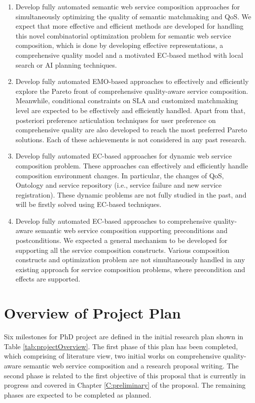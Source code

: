 \begin{enumerate}
 \item Develop fully automated semantic web service composition approaches for simultaneously optimizing the quality of semantic matchmaking and QoS. We expect that more effective and efficient methods are developed for handling this novel combinatorial optimization problem for semantic web service composition, which is done by developing effective representations, a comprehensive quality model and a motivated EC-based method with local search or AI planning techniques.

\item Develop fully automated EMO-based approaches to effectively and efficiently explore the Pareto front of comprehensive quality-aware service composition. Meanwhile, conditional constraints on SLA and customized matchmaking level are expected to be effectively and efficiently handled. Apart from that, posteriori preference articulation techniques for user preference on comprehensive quality are also developed to reach the most preferred Pareto solutions. Each of these achievements is not considered in any past research.

\item Develop fully automated EC-based approaches for dynamic web service composition problem. These approaches can effectively and efficiently handle composition environment changes. In particular, the changes of QoS, Ontology and service repository (i.e., service failure and new service registration). These dynamic problems are not fully studied in the past, and will be firstly solved using EC-based techniques.

\item Develop fully automated EC-based approaches to comprehensive quality-aware semantic web service composition supporting preconditions and postconditions. We expected a general mechanism to be developed for supporting all the service composition constructs. Various composition constructs and optimization problem are not simultaneously handled in any existing approach for service composition problems, where precondition and effects are supported.
\end{enumerate}

\section{Overview of Project Plan}

Six milestones for PhD project are defined in the initial research plan shown in Table \ref{tab:projectOverview}. The first phase of this plan has been completed, which comprising of literature view, two initial works on comprehensive quality-aware semantic web service composition and a research proposal writing. The second phase is related to the first objective of this proposal that is currently in progress and covered in Chapter \ref{C:preliminary} of the proposal. The remaining phases are expected to be completed as planned.

